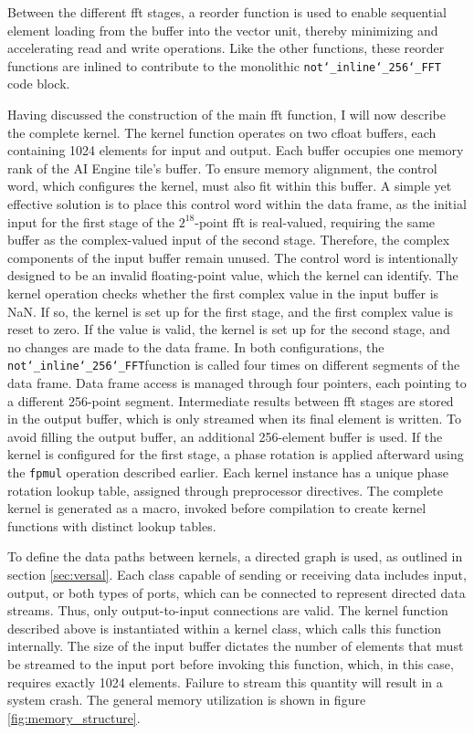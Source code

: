 Between the different \ac{fft} stages, a reorder function is used to enable sequential element loading from the buffer into the vector unit, thereby minimizing and accelerating read and write operations. Like the other functions, these reorder functions are inlined to contribute to the monolithic \texttt{not\char`_inline\char`_256\char`_FFT} code block. \par
Having discussed the construction of the main \ac{fft} function, I will now describe the complete kernel. The kernel function operates on two cfloat buffers, each containing 1024 elements for input and output. Each buffer occupies one memory rank of the AI Engine tile’s buffer. To ensure memory alignment, the control word, which configures the kernel, must also fit within this buffer. A simple yet effective solution is to place this control word within the data frame, as the initial input for the first stage of the $2^{18}$-point \ac{fft} is real-valued, requiring the same buffer as the complex-valued input of the second stage. Therefore, the complex components of the input buffer remain unused. The control word is intentionally designed to be an invalid floating-point value, which the kernel can identify. The kernel operation checks whether the first complex value in the input buffer is NaN. If so, the kernel is set up for the first stage, and the first complex value is reset to zero. If the value is valid, the kernel is set up for the second stage, and no changes are made to the data frame. In both configurations, the \texttt{not\char`_inline\char`_256\char`_FFT}function is called four times on different segments of the data frame. Data frame access is managed through four pointers, each pointing to a different 256-point segment. Intermediate results between \ac{fft} stages are stored in the output buffer, which is only streamed when its final element is written. To avoid filling the output buffer, an additional 256-element buffer is used. If the kernel is configured for the first stage, a phase rotation is applied afterward using the \texttt{fpmul} operation described earlier. Each kernel instance has a unique phase rotation lookup table, assigned through preprocessor directives. The complete kernel is generated as a macro, invoked before compilation to create kernel functions with distinct lookup tables.\par
To define the data paths between kernels, a directed graph is used, as outlined in section \ref{sec:versal}. Each class capable of sending or receiving data includes input, output, or both types of ports, which can be connected to represent directed data streams. Thus, only output-to-input connections are valid. The kernel function described above is instantiated within a kernel class, which calls this function internally. The size of the input buffer dictates the number of elements that must be streamed to the input port before invoking this function, which, in this case, requires exactly 1024 elements. Failure to stream this quantity will result in a system crash. The general memory utilization is shown in figure \ref{fig:memory_structure}. \par
